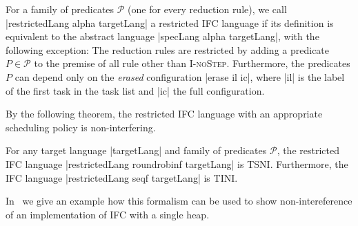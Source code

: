



\begin{definition}
  \label{def:restricted}
  For a family of predicates $\mathcal P$ (one for every reduction
  rule), we call
  |restrictedLang alpha targetLang| a restricted IFC language
  if its definition is equivalent to the abstract language
  |specLang alpha targetLang|, with the following exception:
  The reduction rules are restricted
  by adding a predicate $P \in \mathcal P$ to the premise of
  all rule other than \textsc{I-noStep}.  Furthermore, the predicates $P$
  can depend only on the \textit{erased} configuration
  |erase il ic|, where |il| is the label of the first task
  in the task list and |ic| the full configuration.
\end{definition}

By the following theorem, the restricted IFC language with an
appropriate scheduling policy is non-interfering.

\begin{theorem}
  \label{thm:restricted}
  For any target language |targetLang| and family of predicates
  $\mathcal{P}$, the restricted IFC language |restrictedLang roundrobinf targetLang|
  is TSNI.  Furthermore, the IFC language
  |restrictedLang seqf targetLang| is TINI.
\end{theorem}

In~ we give an example how this formalism can be used
to show non-intereference of an implementation of IFC with a single heap.
